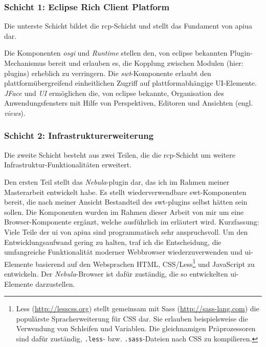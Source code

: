 \subsubsection{Schicht 1: Eclipse Rich Client Platform}

Die unterste Schicht bildet die \gls{rcp}-Schicht und stellt das Fundament von \gls{apiua} dar.

Die Komponenten \textit{\acrshort{osgi}} und \textit{Runtime} stellen den, von \gls{eclipse} bekannten Plugin-Mechanismus bereit und erlauben es, die Kopplung zwischen Modulen (hier: \gls{plugin}s) erheblich zu verringern. Die \textit{\gls{swt}}-Komponente erlaubt den plattformübergreifend einheitlichen Zugriff auf plattformabhängige UI-Elemente. \textit{JFace} und \textit{UI} ermöglichen die, von \gls{eclipse} bekannte, Organisation des Anwendungsfensters mit Hilfe von Perspektiven, Editoren und Ansichten (engl. \textit{views}).


\subsubsection{Schicht 2: Infrastrukturerweiterung}

Die zweite Schicht besteht aus zwei Teilen, die die \gls{rcp}-Schicht um weitere Infrastruktur-Funktionalitäten erweitert.

Den ersten Teil stellt das \textit{Nebula}-\gls{plugin} dar, das ich im Rahmen meiner Masterarbeit entwickelt \citep{Kahlert:2011wr} habe. Es stellt wiederverwendbare \gls{swt}-Komponenten bereit, die nach meiner Ansicht Bestandteil des \gls{swt}-\gls{plugin}s selbst hätten sein sollen. Die Komponenten wurden im Rahmen dieser Arbeit von mir um eine Browser-Komponente ergänzt, welche ausführlich im  erläutert wird. Kurzfassung: Viele Teile der \gls{ui} von \gls{apiua} sind programmatisch sehr anspruchsvoll. Um den Entwicklungsaufwand gering zu halten, traf ich die Entscheidung, die umfangreiche Funktionalität moderner Webbrowser wiederzuverwenden und \gls{ui}-Elemente basierend auf den Websprachen HTML, CSS/Less\footnote{Less (\url{http://lesscss.org}) stellt gemeinsam mit Sass (\url{http://sass-lang.com}) die populärste Spracherweiterung für CSS dar. Sie erlauben beispielsweise die Verwendung von Schleifen und Variablen. Die gleichnamigen Präprozessoren sind dafür zuständig, \texttt{.less}- bzw. \texttt{.sass}-Dateien nach CSS zu kompilieren.} und JavaScript zu entwickeln. Der \textit{Nebula}-Browser ist dafür zuständig, die so entwickelten \gls{ui}-Elemente darzustellen.

